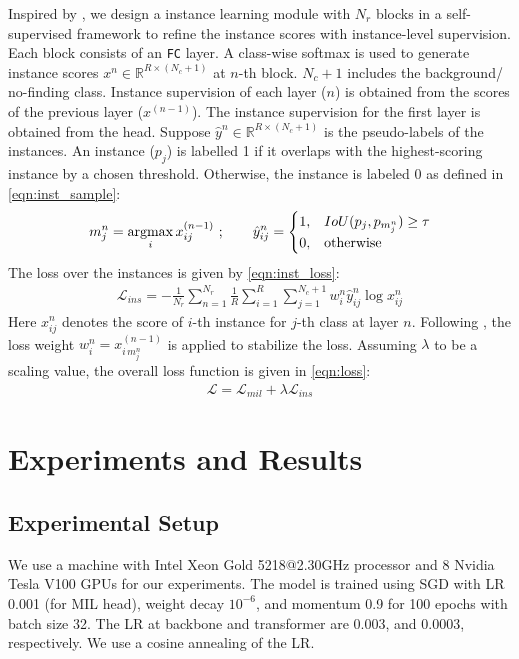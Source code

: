 % 
Inspired by \cite{oicr}, we design a instance learning module with $N_r$ blocks in a self-supervised framework to refine the instance scores with instance-level supervision. Each block consists of an \texttt{FC} layer. A class-wise softmax is used to generate instance scores $x^n \in \mathbb{R}^{R\times(N_c+1)}$ at $n$-th block. $N_c+1$ includes the background/ no-finding class. Instance supervision of each layer ($n$) is obtained from the scores of the previous layer ($x^{(n-1)}$). The instance supervision for the first layer is obtained from the \mil head. Suppose $\hat{y}^n \in \mathbb{R}^{R\times(N_c+1)}$ is the pseudo-labels of the instances. An instance ($p_j$) is labelled 1 if it overlaps with the highest-scoring instance by a chosen threshold. Otherwise, the instance is labeled $0$ as defined in \cref{eqn:inst_sample}:
\begin{align}
    m^n_j = \operatorname*{argmax}_{i}{x^{(n-1)}_{ij}} ~;
    \qquad
    \hat{y}^n_{ij} =  
    \begin{cases}
    1, & IoU(p_j, p_{m^n_j}) \geq \tau\\
    0, & \text{otherwise}
    \end{cases}
    \label{eqn:inst_sample}
\end{align}
The loss over the instances is given by \cref{eqn:inst_loss}:
\begin{align}
    \mathcal{L}_{ins} = - \frac{1}{N_r} \sum_{n=1}^{N_r} \frac{1}{R} \sum_{i=1}^R \sum_{j=1}^{N_c+1} w^{n}_{i} \hat{y}^{n}_{ij} \log x^n_{ij}
    \label{eqn:inst_loss}
\end{align}
Here $x^n_{ij}$ denotes the score of $i$-th instance for $j$-th class at layer $n$. Following \cite{oicr}, the loss weight $w^n_{i} = x^{(n-1)}_{i\,m^n_j}$ is applied to stabilize the loss.
Assuming $\lambda$ to be a scaling value, the overall loss function is given in \cref{eqn:loss}:
\begin{align}
    \mathcal{L} = \mathcal{L}_{mil} + \lambda\mathcal{L}_{ins} 
    \label{eqn:loss}
\end{align}

%
%
\section{Experiments and Results}
%
\subsection{Experimental Setup}
%
We use a machine with Intel Xeon Gold 5218@2.30GHz processor and 8 Nvidia Tesla V100 GPUs for our experiments. The model is trained using SGD with LR 0.001 (for MIL head), weight decay $10^{-6}$, and momentum 0.9 for 100 epochs with batch size 32. The LR at backbone and transformer are 0.003, and 0.0003, respectively. We use a cosine annealing of the LR. 

